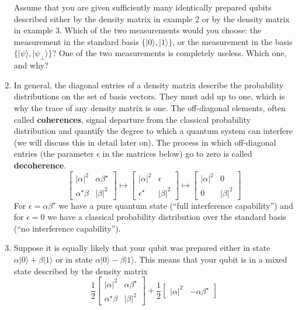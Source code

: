 \documentclass[fleqn]{article}
\begin{document}
\begin{enumerate}
  Assume that you are given sufficiently many identically prepared qubits described either by the density matrix in example 2 or by the density matrix in example 3.
  Which of the two measurements would you choose: the measurement in the standard basis \(\{|0\rangle,|1\rangle\}\), or the measurement in the basis \(\{|\psi\rangle,|\psi_\perp\rangle\}\)?
  One of the two measurements is completely useless.
  Which one, and why?
\item
  In general, the diagonal entries of a density matrix describe the probability distributions on the set of basis vectors.
  They must add up to one, which is why the trace of any density matrix is one.
  The off-diagonal elements, often called \textbf{coherences}, signal departure from the classical probability distribution and quantify the degree to which a quantum system can interfere (we will discuss this in detail later on).
  The process in which off-diagonal entries (the parameter \(\epsilon\) in the matrices below) go to zero is called \textbf{decoherence}.
  \[
     \begin{bmatrix}
       |\alpha|^2 & \alpha\beta^\star
     \\\alpha^\star\beta & |\beta|^2
     \end{bmatrix}
     \mapsto
     \begin{bmatrix}
       |\alpha|^2 & \epsilon
     \\\epsilon^\star & |\beta|^2
     \end{bmatrix}
     \mapsto
     \begin{bmatrix}
       |\alpha|^2 & 0
     \\0 & |\beta|^2
     \end{bmatrix}
   \]
  For \(\epsilon = \alpha\beta^\star\) we have a pure quantum state (``full interference capability'') and for \(\epsilon=0\) we have a classical probability distribution over the standard basis (``no interference capability'').
\item
  Suppose it is equally likely that your qubit was prepared either in state \(\alpha|0\rangle + \beta|1\rangle\) or in state \(\alpha|0\rangle - \beta|1\rangle\).
  This means that your qubit is in a mixed state described by the density matrix
  \[
     \frac12
     \begin{bmatrix}
       |\alpha|^2 & \alpha\beta^\star
     \\\alpha^\star\beta & |\beta|^2
     \end{bmatrix}
     +
     \frac12
     \begin{bmatrix}
       |\alpha|^2 & -\alpha\beta^\star

\end{bmatrix}\]
\end{enumerate}
\end{document}
